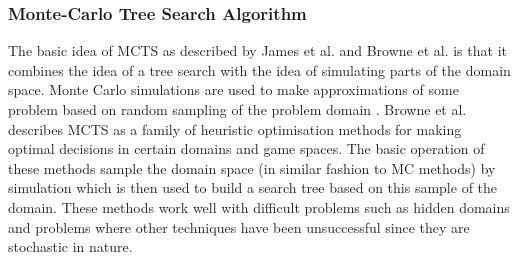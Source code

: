 \documentclass[journal]{IEEEtran}
\begin{document}
  
  \subsubsection{Monte-Carlo Tree Search Algorithm}
  The basic idea of MCTS as described by James et al. \cite{wits} and Browne et al. \cite{survey} is that it combines the idea of a tree search with the idea of simulating parts of the domain space. Monte Carlo simulations are used to make approximations of some problem based on random sampling of the problem domain \cite{survey}. Browne et al. \cite{survey} describes MCTS as a family of heuristic optimisation methods for making optimal decisions in certain domains and game spaces. The basic operation of these methods sample the domain space (in similar fashion to MC methods) by simulation which is then used to build a search tree based on this sample of the domain. These methods work well with difficult problems such as hidden domains and problems where other techniques have been unsuccessful since they are stochastic in nature.\\
  
\end{document}

